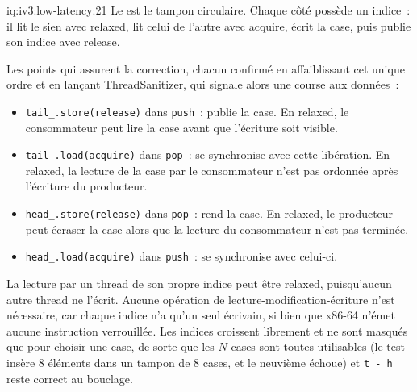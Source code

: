 \begin{solution}{iq:iv3:low-latency:21}
Le  est le tampon circulaire. Chaque côté possède un indice~: il lit le sien avec relaxed, lit celui de l'autre avec acquire, écrit la case, puis publie son indice avec release.
\label{lst:iv3:ll:spsc}

Les points qui assurent la correction, chacun confirmé en affaiblissant cet unique ordre et en lançant ThreadSanitizer, qui signale alors une course aux données~:
\begin{itemize}
\item \texttt{tail\_.store(release)} dans \texttt{push}~: publie la case. En relaxed, le consommateur peut lire la case avant que l'écriture soit visible.
\item \texttt{tail\_.load(acquire)} dans \texttt{pop}~: se synchronise avec cette libération. En relaxed, la lecture de la case par le consommateur n'est pas ordonnée après l'écriture du producteur.
\item \texttt{head\_.store(release)} dans \texttt{pop}~: rend la case. En relaxed, le producteur peut écraser la case alors que la lecture du consommateur n'est pas terminée.
\item \texttt{head\_.load(acquire)} dans \texttt{push}~: se synchronise avec celui-ci.
\end{itemize}
La lecture par un thread de son propre indice peut être relaxed, puisqu'aucun autre thread ne l'écrit. Aucune opération de lecture-modification-écriture n'est nécessaire, car chaque indice n'a qu'un seul écrivain, si bien que x86-64 n'émet aucune instruction verrouillée. Les indices croissent librement et ne sont masqués que pour choisir une case, de sorte que les $N$ cases sont toutes utilisables (le test insère 8 éléments dans un tampon de 8 cases, et le neuvième échoue) et \texttt{t - h} reste correct au bouclage.

\end{solution}

